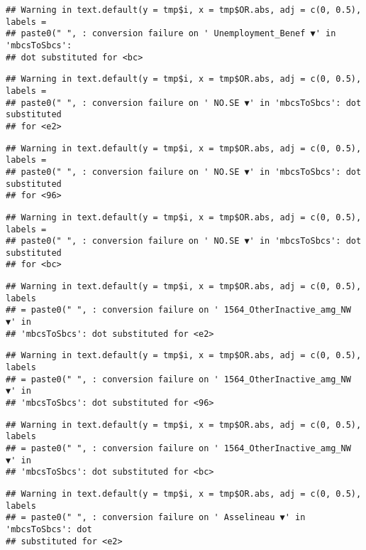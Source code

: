 \documentclass[
]{article}
\begin{document}
\begin{verbatim}
## Warning in text.default(y = tmp$i, x = tmp$OR.abs, adj = c(0, 0.5), labels =
## paste0(" ", : conversion failure on ' Unemployment_Benef ▼' in 'mbcsToSbcs':
## dot substituted for <bc>
\end{verbatim}

\begin{verbatim}
## Warning in text.default(y = tmp$i, x = tmp$OR.abs, adj = c(0, 0.5), labels =
## paste0(" ", : conversion failure on ' NO.SE ▼' in 'mbcsToSbcs': dot substituted
## for <e2>
\end{verbatim}

\begin{verbatim}
## Warning in text.default(y = tmp$i, x = tmp$OR.abs, adj = c(0, 0.5), labels =
## paste0(" ", : conversion failure on ' NO.SE ▼' in 'mbcsToSbcs': dot substituted
## for <96>
\end{verbatim}

\begin{verbatim}
## Warning in text.default(y = tmp$i, x = tmp$OR.abs, adj = c(0, 0.5), labels =
## paste0(" ", : conversion failure on ' NO.SE ▼' in 'mbcsToSbcs': dot substituted
## for <bc>
\end{verbatim}

\begin{verbatim}
## Warning in text.default(y = tmp$i, x = tmp$OR.abs, adj = c(0, 0.5), labels
## = paste0(" ", : conversion failure on ' 1564_OtherInactive_amg_NW ▼' in
## 'mbcsToSbcs': dot substituted for <e2>
\end{verbatim}

\begin{verbatim}
## Warning in text.default(y = tmp$i, x = tmp$OR.abs, adj = c(0, 0.5), labels
## = paste0(" ", : conversion failure on ' 1564_OtherInactive_amg_NW ▼' in
## 'mbcsToSbcs': dot substituted for <96>
\end{verbatim}

\begin{verbatim}
## Warning in text.default(y = tmp$i, x = tmp$OR.abs, adj = c(0, 0.5), labels
## = paste0(" ", : conversion failure on ' 1564_OtherInactive_amg_NW ▼' in
## 'mbcsToSbcs': dot substituted for <bc>
\end{verbatim}

\begin{verbatim}
## Warning in text.default(y = tmp$i, x = tmp$OR.abs, adj = c(0, 0.5), labels
## = paste0(" ", : conversion failure on ' Asselineau ▼' in 'mbcsToSbcs': dot
## substituted for <e2>
\end{verbatim}
\end{document}
